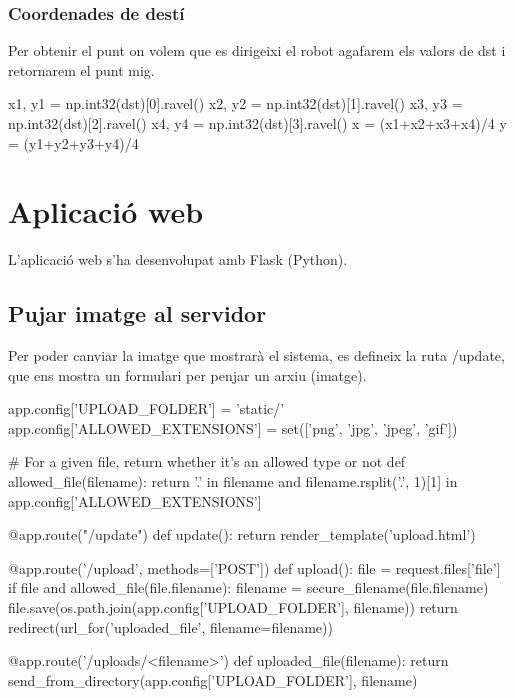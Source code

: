 		\subsubsection{Coordenades de destí}
Per obtenir el punt on volem que es dirigeixi el robot agafarem els valors de dst i retornarem el punt mig.\\
		\begin{python}
		x1, y1 = np.int32(dst)[0].ravel()
		x2, y2 = np.int32(dst)[1].ravel()
		x3, y3 = np.int32(dst)[2].ravel()
		x4, y4 = np.int32(dst)[3].ravel()
		x = (x1+x2+x3+x4)/4
		y = (y1+y2+y3+y4)/4
		\end{python}

\newpage
\section{Aplicació web}
	L'aplicació web s'ha desenvolupat amb Flask (Python).
	\subsection{Pujar imatge al servidor}
		Per poder canviar la imatge que mostrarà el sistema, es defineix la ruta /update, que ens mostra un formulari per penjar un arxiu (imatge).\\
		\begin{python}
app.config['UPLOAD_FOLDER'] = 'static/'
app.config['ALLOWED_EXTENSIONS'] = set(['png', 'jpg', 'jpeg', 'gif'])

# For a given file, return whether it's an allowed type or not
def allowed_file(filename):
	return '.' in filename and 
		filename.rsplit('.', 1)[1] in app.config['ALLOWED_EXTENSIONS']

@app.route("/update")
def update():
	return render_template('upload.html')

@app.route('/upload', methods=['POST'])
def upload():
	file = request.files['file']
	if file and allowed_file(file.filename):
		filename = secure_filename(file.filename)
		file.save(os.path.join(app.config['UPLOAD_FOLDER'], filename))
		return redirect(url_for('uploaded_file', filename=filename))

@app.route('/uploads/<filename>')
def uploaded_file(filename):
	return send_from_directory(app.config['UPLOAD_FOLDER'], filename)
		\end{python}

